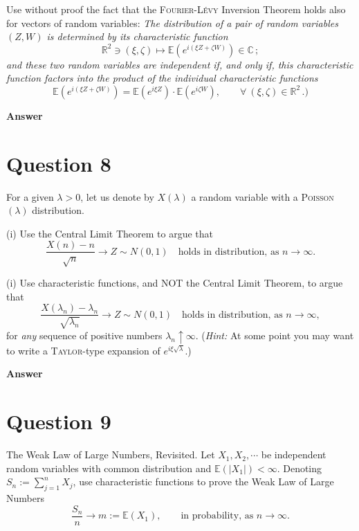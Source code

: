 \documentclass[letterpaper]{article}
\begin{document}
		\indent Use without proof the fact that the \textsc{Fourier}-\textsc{L\'{e}vy} Inversion Theorem holds also for vectors of random variables: \textit{The distribution of a pair of random variables $(Z, W)$ is determined by its characteristic function}
		\[
		\mathbb{R}^2 \ni (\xi, \zeta) \mapsto \mathbb{E}\!\left(e^{i(\xi Z + \zeta W)}\right) \in \mathbb{C}\,;
		\]
		\textit{and these two random variables are independent if, and only if, this characteristic function factors into the product of the individual characteristic functions}
		\[
		\mathbb{E}\!\left(e^{i(\xi Z + \zeta W)}\right) = \mathbb{E}\!\left(e^{i\xi Z}\right) \cdot \mathbb{E}\!\left(e^{i\zeta W}\right), \qquad \forall\ (\xi, \zeta) \in \mathbb{R}^2\,.)
		\]

		
		\textbf{Answer}
		
		\clearpage
		
		\section{Question 8}
		
		For a given $\lambda > 0$, let us denote by $X(\lambda)$ a random variable with a \textsc{Poisson}$(\lambda)$ distribution.
		
		(i) Use the Central Limit Theorem to argue that
		\[
		\frac{X(n) - n}{\sqrt{n}} \longrightarrow Z \sim N(0,1) \quad \text{holds in distribution, as } n \to \infty.
		\]
		
		(i) Use characteristic functions, and NOT the Central Limit Theorem, to argue that
		\[
		\frac{X(\lambda_n) - \lambda_n}{\sqrt{\lambda_n}} \longrightarrow Z \sim N(0,1) \quad \text{holds in distribution, as } n \to \infty,
		\]
		for \textit{any} sequence of positive numbers $\lambda_n \uparrow \infty$.
		(\textit{Hint:} At some point you may want to write a \textsc{Taylor}-type expansion of $e^{i\xi\sqrt{\lambda}}$.)
		
		\textbf{Answer}
		
		\clearpage
		
		\section{Question 9}
		
		The Weak Law of Large Numbers, Revisited. Let $X_1,X_2,\cdots$ be independent random variables with common distribution and $\mathbb{E}(|X_1|)<\infty$. Denoting $S_n:=\sum_{j=1}^n X_j$, use characteristic functions to prove the Weak Law of Large Numbers
		\[
		\frac{S_n}{n}\to m:=\mathbb{E}(X_1), \qquad \text{in probability, as } n\to\infty.
		\]
		
\end{document}
